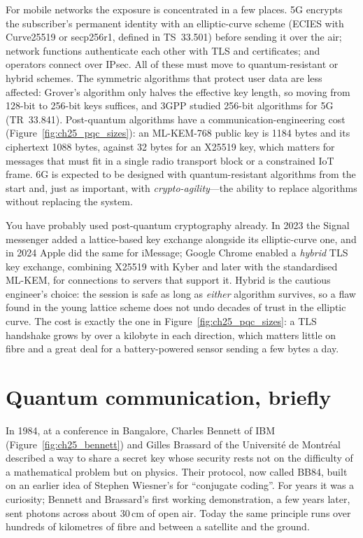 For mobile networks the exposure is concentrated in a few places. 5G encrypts the subscriber's
permanent identity with an elliptic-curve scheme (ECIES with Curve25519 or secp256r1, defined in TS~33.501)
before sending it over the air; network functions authenticate each other with TLS and certificates;
and operators connect over IPsec. All of these must move to quantum-resistant or hybrid schemes. The
symmetric algorithms that protect user data are less affected: Grover's algorithm only halves the
effective key length, so moving from 128-bit to 256-bit keys suffices, and 3GPP studied 256-bit
algorithms for 5G (TR~33.841). Post-quantum algorithms have a communication-engineering cost
(Figure~\ref{fig:ch25_pqc_sizes}): an ML-KEM-768 public key is 1184 bytes and its ciphertext 1088
bytes, against 32 bytes for an X25519 key, which matters for messages that must fit in a single radio
transport block or a constrained IoT frame. 6G is expected to be designed with quantum-resistant
algorithms from the start and, just as important, with \emph{crypto-agility}---the ability to replace
algorithms without replacing the system.

\begin{inpractice}
You have probably used post-quantum cryptography already. In 2023 the Signal messenger added a
lattice-based key exchange alongside its elliptic-curve one, and in 2024 Apple did the same for
iMessage; Google Chrome enabled a \emph{hybrid} TLS key exchange, combining X25519 with Kyber and
later with the standardised ML-KEM, for connections to servers that support it. Hybrid is the
cautious engineer's choice: the session is safe as long as \emph{either} algorithm survives, so a
flaw found in the young lattice scheme does not undo decades of trust in the elliptic curve. The
cost is exactly the one in Figure~\ref{fig:ch25_pqc_sizes}: a TLS handshake grows by over a kilobyte
in each direction, which matters little on fibre and a great deal for a battery-powered sensor
sending a few bytes a day.
\end{inpractice}

\section{Quantum communication, briefly}
\label{sec:ch25:quantum}

In 1984, at a conference in Bangalore, Charles Bennett of IBM (Figure~\ref{fig:ch25_bennett}) and
Gilles Brassard of the Universit\'e de Montr\'eal described a way to share a secret key whose security
rests not on the difficulty of a mathematical problem but on physics. Their protocol, now called
BB84, built on an earlier idea of Stephen Wiesner's for ``conjugate coding''. For years it was a
curiosity; Bennett and Brassard's first working demonstration, a few years later, sent photons across
about 30\,cm of open air. Today the same principle runs over hundreds of kilometres of fibre and
between a satellite and the ground.

